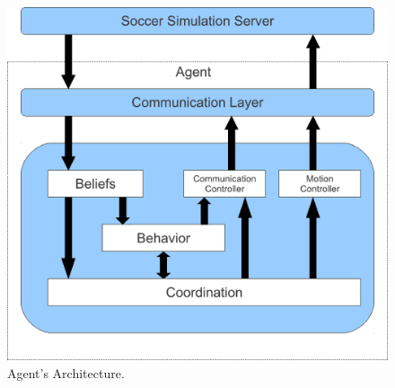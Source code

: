 \begin{figure}[htb!]
\centering
  \includegraphics[scale=0.6]{Chapter3/figures/Arch.pdf}
  \caption{Agent's Architecture.}
  \label{fig:Architecture}
\end{figure}












